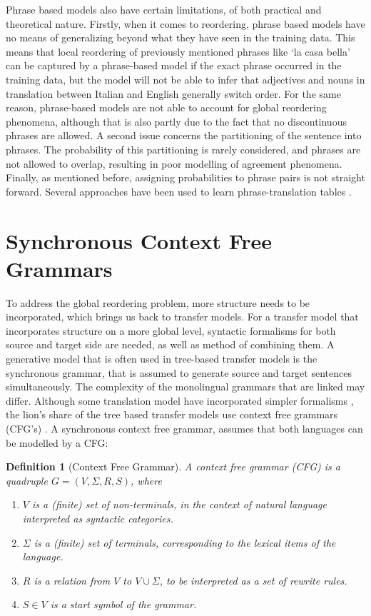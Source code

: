\documentclass{report}
\theoremstyle{definition}
\theoremstyle{plain}
\newtheorem{definition}{Definition}
\begin{document}
Phrase based models also have certain limitations, of both practical and theoretical nature. Firstly, when it comes to reordering, phrase based models have no means of generalizing beyond what they have seen in the training data. This means that local reordering of previously mentioned phrases like `la casa bella' can be captured by a phrase-based model if the exact phrase occurred in the training data, but the model will not be able to infer that adjectives and nouns in translation between Italian and English generally switch order. For the same reason, phrase-based models are not able to account for global reordering phenomena, although that is also partly due to the fact that no discontinuous phrases are allowed. A second issue concerns the partitioning of the sentence into phrases. The probability of this partitioning is rarely considered, and phrases are not allowed to overlap, resulting in poor modelling of agreement phenomena. Finally, as mentioned before, assigning probabilities to phrase pairs is not straight forward. Several approaches have been used to learn phrase-translation tables \citep[see][p.130]{koehn2008statistical}.

\section{Synchronous Context Free Grammars}
\label{sec:SCFGs}

To address the global reordering problem, more structure needs to be incorporated, which brings us back to transfer models. For a transfer model that incorporates structure on a more global level, syntactic formalisms for both source and target side are needed, as well as method of combining them. A generative model that is often used in tree-based transfer models is the synchronous grammar, that is assumed to generate source and target sentences simultaneously. The complexity of the monolingual grammars that are linked may differ. Although some translation model have incorporated simpler formalisms \citep[e.g., finite state machines, in][]{alshawi2000learning}, the lion's share of the tree based transfer models use context free grammars (CFG's) \citep{chomsky1956three}. A synchronous context free grammar, assumes that both languages can be modelled by a CFG:


\begin{definition}[Context Free Grammar]
A context free grammar (CFG) is a quadruple $G = (V, \Sigma, R, S)$, where\begin{enumerate}
\item $V$ is a (finite) set of non-terminals, in the context of natural language interpreted as syntactic categories.
\item $\Sigma$ is a (finite) set of terminals, corresponding to the lexical items of the language.
\item $R$ is a relation from $V$ to $V\cup\Sigma$, to be interpreted as a set of rewrite rules.
\item $S\in V$ is a start symbol of the grammar.
\end{enumerate}
\end{definition}
\end{document}
